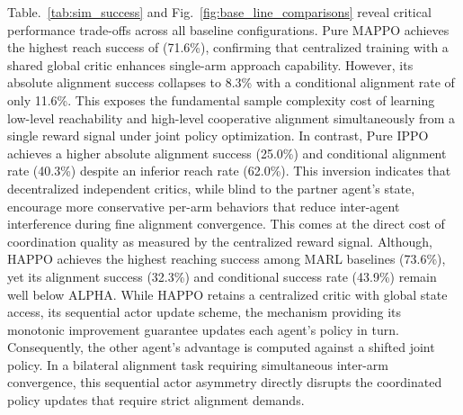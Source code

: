 \documentclass[a4paper,fleqn]{cas-dc}
\begin{document}
Table.~\ref{tab:sim_success} and Fig.~\ref{fig:base_line_comparisons} reveal critical performance trade-offs across all baseline configurations. Pure MAPPO achieves the highest reach success of (71.6\%), confirming that centralized training with a shared global critic enhances single-arm approach capability. However, its absolute alignment success collapses to 8.3\% with a conditional alignment rate of only 11.6\%. This exposes the fundamental sample complexity cost of learning low-level reachability and high-level cooperative alignment simultaneously from a single reward signal under joint policy optimization. In contrast, Pure IPPO achieves a higher absolute alignment success (25.0\%) and conditional alignment rate (40.3\%) despite an inferior reach rate (62.0\%). This inversion indicates that decentralized independent critics, while blind to the partner agent's state, encourage more conservative per-arm behaviors that reduce inter-agent interference during fine alignment convergence. This comes at the direct cost of coordination quality as measured by the centralized reward signal. Although, HAPPO achieves the highest reaching success among MARL baselines (73.6\%), yet its alignment success (32.3\%) and conditional success rate (43.9\%) remain well below ALPHA. While HAPPO retains a centralized critic with global state access, its sequential actor update scheme, the mechanism providing its monotonic improvement guarantee updates each agent's policy in turn. Consequently, the other agent's advantage is computed against a shifted joint policy. In a bilateral alignment task requiring simultaneous inter-arm convergence, this sequential actor asymmetry directly disrupts the coordinated policy updates that require strict alignment demands.
\end{document}
